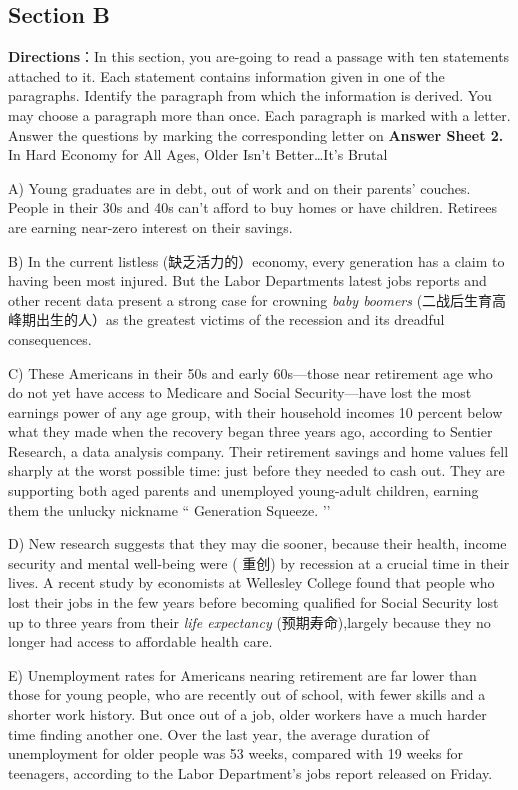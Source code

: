 \documentclass[UTF8,11pt]{ctexart}
\begin{document}
\subsection*{Section B}


\textbf{Directions}：In this section, you are-going to read a passage with ten statements attached to it. Each statement contains information given in one of the paragraphs. Identify the paragraph from which the information is derived. You may choose a paragraph more than once. Each paragraph is marked with a letter. Answer the questions by marking the corresponding letter on\textbf{ Answer Sheet 2.} In Hard Economy for All Ages, Older Isn’t Better…It’s Brutal


A) Young graduates are in debt, out of work and on their parents’ couches. People in their 30s and 40s can’t afford to buy homes or have children. Retirees are earning near-zero interest on their savings.


B) In the current listless (缺乏活力的）economy, every generation has a claim to having been most injured. But the Labor Departments latest jobs reports and other recent data present a strong case for crowning\textit{ baby boomers} (二战后生育高峰期出生的人）as the greatest victims of the recession and its dreadful consequences.


C) These Americans in their 50s and early 60s—those near retirement age who do not yet have access to Medicare and Social Security—have lost the most earnings power of any age group, with their household incomes 10 percent below what they made when the recovery began three years ago, according to Sentier Research, a data analysis company. Their retirement savings and home values fell sharply at the worst possible time: just before they needed to cash out. They are supporting both aged parents and unemployed young-adult children, earning them the unlucky nickname “ Generation Squeeze. ’’


D) New research suggests that they may die sooner, because their health, income security and mental well-being were ( 重创) by recession at a crucial time in their lives. A recent study by economists at Wellesley College found that people who lost their jobs in the few years before becoming qualified for Social Security lost up to three years from their\textit{ life expectancy} (预期寿命),largely because they no longer had access to affordable health care.


E) Unemployment rates for Americans nearing retirement are far lower than those for young people, who are recently out of school, with fewer skills and a shorter work history. But once out of a job, older workers have a much harder time finding another one. Over the last year, the average duration of unemployment for older people was 53 weeks, compared with 19 weeks for teenagers, according to the Labor Department’s jobs report released on Friday.
\end{document}
